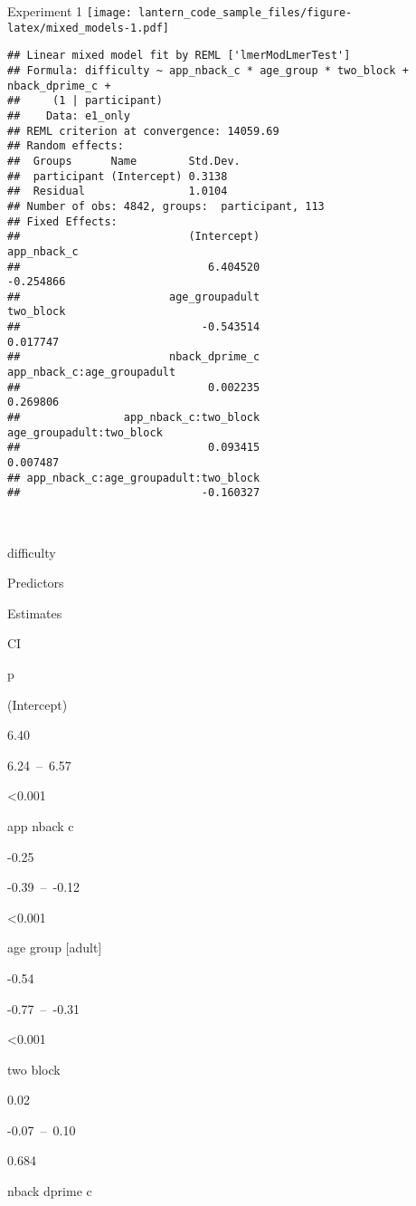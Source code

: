 \documentclass[
]{article}
\begin{document}
Experiment 1
\texttt{[image: lantern\_code\_sample\_files/figure-latex/mixed\_models-1.pdf]}

\begin{verbatim}
## Linear mixed model fit by REML ['lmerModLmerTest']
## Formula: difficulty ~ app_nback_c * age_group * two_block + nback_dprime_c +  
##     (1 | participant)
##    Data: e1_only
## REML criterion at convergence: 14059.69
## Random effects:
##  Groups      Name        Std.Dev.
##  participant (Intercept) 0.3138  
##  Residual                1.0104  
## Number of obs: 4842, groups:  participant, 113
## Fixed Effects:
##                          (Intercept)                           app_nback_c  
##                             6.404520                             -0.254866  
##                       age_groupadult                             two_block  
##                            -0.543514                              0.017747  
##                       nback_dprime_c            app_nback_c:age_groupadult  
##                             0.002235                              0.269806  
##                app_nback_c:two_block              age_groupadult:two_block  
##                             0.093415                              0.007487  
## app_nback_c:age_groupadult:two_block  
##                            -0.160327
\end{verbatim}

~

difficulty

Predictors

Estimates

CI

p

(Intercept)

6.40

6.24~--~6.57

\textless0.001

app nback c

-0.25

-0.39~--~-0.12

\textless0.001

age group {[}adult{]}

-0.54

-0.77~--~-0.31

\textless0.001

two block

0.02

-0.07~--~0.10

0.684

nback dprime c
\end{document}
